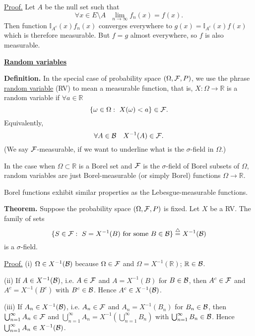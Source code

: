 \documentclass[a4paper,10pt]{article}
\def\RR{\mathbb{R}}
\def\II{\mathbb{I}}
\newcommand{\1}[1]{\mathbf{1}_{\{#1\}}}
\newcommand{\defi}{\stackrel{\triangle}{=}}
\begin{document}
\underline{Proof.} Let $A$ be the null set such that
  $$\forall x\in E\setminus A~~~\lim_{n\to\infty} f_n(x)=f(x).$$
Then function $\II_{A^c}(x) f_n(x)$ converges everywhere to $g(x)=\II_{A^c}(x)f(x)$ which is therefore measurable. But $f=g$ almost everywhere, so $f$ is also measurable. \blacksquare\vspace{3mm}

\begin{center}\bf\underline{Random variables} \end{center}\vspace{3mm}

{\bf Definition.} In the special case of probability space $(\Omega,{\cal F},P)$, we use the phrase \underline{random variable} (RV) to mean a measurable function, that is, $X:\Omega\to \RR$ is a random variable if $\forall a \in \RR$
  $$\{\omega\in\Omega:~X(\omega)<a\}\in{\cal F}.$$
Equivalently,
  $$\forall A\in{\cal B}~~~X^{-1}(A)\in{\cal F}.$$
(We say $\cal F$-measurable, if we want to underline what is the $\sigma$-field in $\Omega$.)
\vspace{3mm}

In the case when $\Omega\subset\RR$ is a Borel set and $\cal F$ is the $\sigma$-field of Borel subsets of $\Omega$, random variables are just Borel-measurable (or simply Borel) functions $\Omega\to\RR$.

Borel functions exhibit similar properties as the Lebesgue-measurable functions.

{\bf Theorem.} Suppose the probability space $(\Omega,{\cal F},P)$ is fixed. Let $X$ be a RV. The family of sets
  $$\{S\in{\cal F}:~S=X^{-1}(B) \mbox{ for some } B\in{\cal B}\}\defi X^{-1}({\cal B})$$
is a $\sigma$-field. \vspace{3mm}

\underline{Proof.} (i) $\Omega\in X^{-1}({\cal B})$ because $\Omega\in{\cal F}$ and $\Omega=X^{-1}(\RR)$; $\RR\in{\cal B}$.

(ii) If $A\in X^{-1}({\cal B})$, i.e. $A\in{\cal F}$ and $A=X^{-1}(B)$ for $B\in{\cal B}$, then $A^c\in{\cal F}$ and $A^c=X^{-1}(B^c)$ with $B^c\in{\cal B}$. Hence $A^c\in X^{-1}({\cal B})$.

(iii) If $A_n\in X^{-1}({\cal B})$, i.e. $A_n\in{\cal F}$ and $A_n=X^{-1}(B_n)$ for $B_n\in{\cal B}$, then $\bigcup_{n=1}^\infty A_n\in{\cal F}$ and $\bigcup_{n=1}^\infty A_n=X^{-1}(\bigcup_{n=1}^\infty B_n)$ with $\bigcup_{n=1}^\infty B_n\in{\cal B}$. Hence $\bigcup_{n=1}^\infty A_n\in X^{-1}({\cal B})$. \blacksquare \vspace{3mm}
\end{document}
